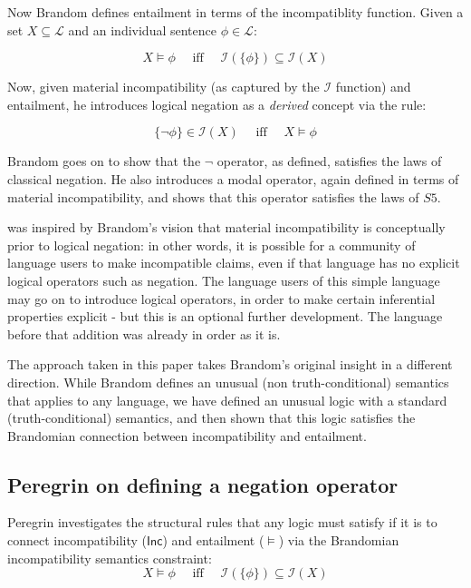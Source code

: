 \NI Now Brandom defines entailment in terms of the incompatiblity
function. Given a set $X \subseteq \mathcal{L}$ and an individual
sentence $\phi \in \mathcal{L}$:

\[
   X \models \phi\quad \text{ iff }\quad \mathcal{I}(\{\phi\}) \subseteq \mathcal{I}(X)
\]

\NI Now, given material incompatibility (as captured by the
$\mathcal{I}$ function) and entailment, he introduces logical negation
as a \emph{derived} concept via the rule:

\[
   \{\neg \phi\} \in \mathcal{I}(X)\quad \text{ iff }\quad X \models \phi
\]

\NI Brandom goes on to show that the $\neg$ operator, as defined, satisfies
the laws of classical negation.  He also introduces a modal operator,
again defined in terms of material incompatibility, and shows that
this operator satisfies the laws of $S5$.

\Cathoristic{} was inspired by Brandom's vision that material
incompatibility is conceptually prior to logical negation: in other
words, it is possible for a community of language users to make incompatible claims, even if that
language has no explicit logical operators such as negation.  The
language users of this simple language may go on to introduce logical
operators, in order to make certain inferential properties explicit -
but this is an optional further development.  The language before that
addition was already in order as it is.

The approach taken in this paper takes Brandom's original insight in a
different direction.  While Brandom defines an unusual (non
truth-conditional) semantics that applies to any language, we have
defined an unusual logic with a standard (truth-conditional) semantics, and then shown that this logic satisfies the Brandomian connection between incompatibility and entailment.

\subsection{Peregrin on defining a negation operator}\label{peregrin}

Peregrin \cite{PeregrinJ:logbasoi} investigates the  structural
rules that any logic must satisfy if it is to connect incompatibility
($\mathsf{Inc}$) and entailment ($\models$) via the Brandomian
incompatibility semantics constraint:
\[
X \models \phi \quad\text{ iff }\quad \mathcal{I}(\{\phi\}) \subseteq \mathcal{I}(X)
\]

